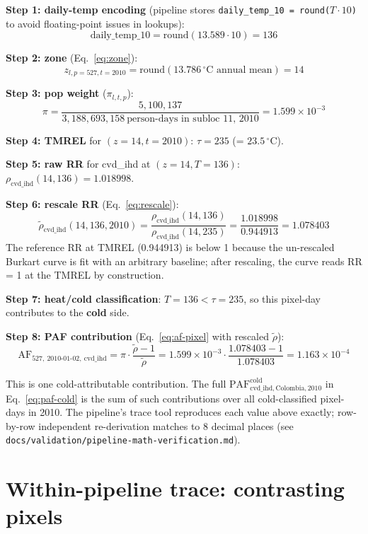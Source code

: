 \documentclass[11pt]{article}
\newcommand{\PAF}{\text{PAF}}
\begin{document}
\textbf{Step 1: daily-temp encoding} (pipeline stores
\texttt{daily\_temp\_10 = round($T \cdot 10$)} to avoid floating-point
issues in lookups):
\[
\text{daily\_temp\_10} = \text{round}(13.589 \cdot 10) = 136
\]

\textbf{Step 2: zone} (Eq.~\ref{eq:zone}):
\[
z_{l, p=527, t=2010} = \text{round}(13.786\,^{\circ}\text{C annual mean}) = 14
\]

\textbf{Step 3: pop weight} ($\pi_{l,t,p}$):
\[
\pi = \frac{5{,}100{,}137}{3{,}188{,}693{,}158\ \text{person-days in subloc 11, 2010}} = 1.599 \times 10^{-3}
\]

\textbf{Step 4: TMREL} for $(z=14, t=2010)$:
$\tau = 235$ (= $23.5\,^{\circ}$C).

\textbf{Step 5: raw RR} for cvd\_ihd at $(z=14, T=136)$:
$\rho_{\text{cvd\_ihd}}(14, 136) = 1.018998$.

\textbf{Step 6: rescale RR} (Eq.~\ref{eq:rescale}):
\[
\tilde\rho_{\text{cvd\_ihd}}(14, 136, 2010)
= \frac{\rho_{\text{cvd\_ihd}}(14, 136)}{\rho_{\text{cvd\_ihd}}(14, 235)}
= \frac{1.018998}{0.944913}
= 1.078403
\]
The reference RR at TMREL (0.944913) is below 1 because the un-rescaled
Burkart curve is fit with an arbitrary baseline; after rescaling, the
curve reads RR = 1 at the TMREL by construction.

\textbf{Step 7: heat/cold classification}: $T = 136 < \tau = 235$, so
this pixel-day contributes to the \textbf{cold} side.

\textbf{Step 8: PAF contribution} (Eq.~\ref{eq:af-pixel} with rescaled
$\tilde\rho$):
\[
\text{AF}_{527,\ \text{2010-01-02},\ \text{cvd\_ihd}}
= \pi \cdot \frac{\tilde\rho - 1}{\tilde\rho}
= 1.599\!\times\!10^{-3} \cdot \frac{1.078403 - 1}{1.078403}
= 1.163 \times 10^{-4}
\]

This is one cold-attributable contribution. The full
$\PAF^{\text{cold}}_{\text{cvd\_ihd}, \text{Colombia}, 2010}$ in
Eq.~\eqref{eq:paf-cold} is the sum of such contributions over all
cold-classified pixel-days in 2010. The pipeline's trace tool reproduces
each value above exactly; row-by-row independent re-derivation matches
to 8 decimal places (see
\texttt{docs/validation/pipeline-math-verification.md}).

\section{Within-pipeline trace: contrasting pixels}
\label{sec:trace-contrasting}
\end{document}

